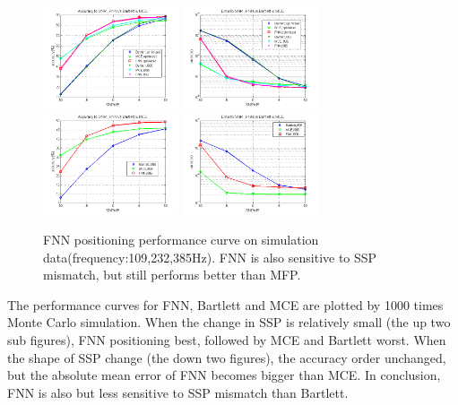 \begin{figure}
\includegraphics[width=4cm,height=3cm]{figure/Accuracy_to_SNR_FNN_vs_Bartlett_MCE}
\includegraphics[width=4cm,height=3cm]{figure/Error_to_SNR_FNN_vs_Bartlett_MCE}
\includegraphics[width=4cm,height=3cm]{figure/Accuracy_to_SNR_FNN_vs_Bartlett_MCE_i906}
\includegraphics[width=4cm,height=3cm]{figure/Error_to_SNR_FNN_vs_Bartlett_MCE_i906}
\caption{FNN positioning performance curve on simulation data(frequency:109,232,385Hz).
 FNN is also sensitive to SSP mismatch, but still performs better than MFP.
}
\end{figure}

The performance curves for FNN, Bartlett and MCE are plotted by 1000 times Monte Carlo simulation. When the change in SSP is relatively small (the up two sub figures), FNN positioning best, followed by MCE and Bartlett worst.
When the shape of SSP change (the down two figures), the accuracy order unchanged, but the absolute mean error of FNN becomes bigger than MCE. In conclusion, FNN is also but less sensitive to SSP mismatch than Bartlett.

